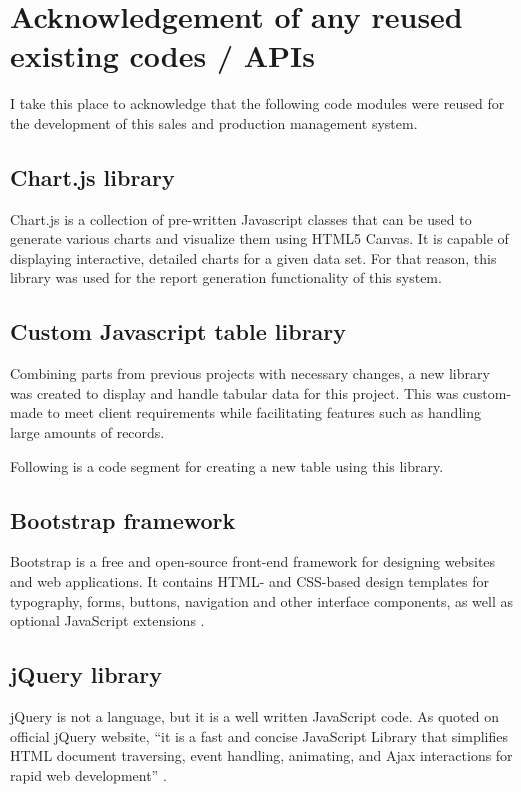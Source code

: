 \documentclass[12pt]{report}
\begin{document}
\newpage
\section{Acknowledgement of any reused existing codes / APIs}
I take this place to acknowledge that the following code modules were reused for the development of this sales and production management system.

\subsection{Chart.js library}
Chart.js is a collection of pre-written Javascript classes that can be used to generate various charts and visualize them using HTML5 Canvas. It is capable of displaying interactive, detailed charts for a given data set. For that reason, this library was used for the report generation functionality of this system.

\subsection{Custom Javascript table library}
Combining parts from previous projects with necessary changes, a new library was created to display and handle tabular data for this project. This was custom-made to meet client requirements while facilitating features such as handling large amounts of records.

\noindent
Following is a code segment for creating a new table using this library.



\subsection{Bootstrap framework}
Bootstrap is a free and open-source front-end framework for designing
websites and web applications. It contains HTML- and CSS-based design templates for typography, forms, buttons, navigation and other interface components, as well as optional JavaScript extensions \cite{chahal_2019_bootstrap}.

\subsection{jQuery library}
jQuery is not a language, but it is a well written JavaScript code. As quoted on
official jQuery website, ``it is a fast and concise JavaScript Library that simplifies HTML document traversing, event handling, animating, and Ajax interactions for rapid web development'' \cite{chaffer_2007_jquery}.
\end{document}
